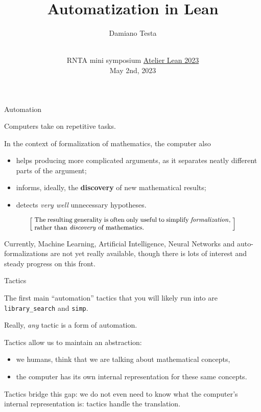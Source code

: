 \documentclass{beamer}
\title{Automatization in Lean}
\author{Damiano Testa}
\institute{University of Warwick}
\date{\\
\vspace{50pt}
RNTA mini symposium
\href{http://www.rnta.eu/7MSRNTA/lean.html}{Atelier Lean 2023}\\
\vspace{20pt}
May 2nd, 2023
}
\begin{document}
\frame{\titlepage}

\begin{frame}[fragile]
{Automation}

Computers take on repetitive tasks.

In the context of formalization of mathematics, the computer also

\begin{itemize}
\item
  helps producing more complicated arguments, as it separates neatly different parts of the argument;
\item
  informs, ideally, the {\textbf{discovery}} of new mathematical results;
\item
  detects {\emph{very well}} unnecessary hypotheses.
\end{itemize}

\smallskip
\[
  \left[ \;
  \makebox{\parbox{0.8\textwidth}{\small
  The resulting generality is often only useful to simplify {\emph{formalization}}, rather than {\emph{discovery}} of mathematics.
  }}
  \; \right]
\]
\bigskip

Currently, Machine Learning, Artificial Intelligence, Neural Networks and auto-formalizations are not yet really available, though there is lots of interest and steady progress on this front.
\end{frame}

\begin{frame}[fragile]{Tactics}

The first main ``automation'' tactics that you will likely run into are {\verb`library_search`} and {\verb`simp`}.

Really, {\emph{any}} tactic is a form of automation.

Tactics allow us to maintain an abstraction:

\begin{itemize}
\item
  we humans, think that we are talking about mathematical concepts,
\item
  the computer has its own internal representation for these same concepts.
\end{itemize}

Tactics bridge this gap: we do not even need to know what the computer's internal representation is: tactics handle the translation.
\end{frame}
\end{document}
